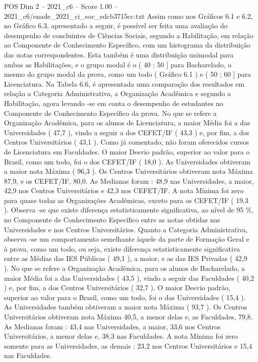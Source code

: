 \begin{textsample}{POS Dim 2 – 2021\_c6 – Score 1.00 – 2021\_c6/enade\_2021\_ci\_soc\_edcb3715cc.txt}
Assim como nos Gráficos 6.1 e 6.2, no Gráfico 6.3, apresentado a seguir, é possível ser feita uma avaliação do desempenho de concluintes de Ciências Sociais, segundo a Habilitação, em relação ao Componente de Conhecimento Específico, com um histograma da distribuição das notas correspondentes.
Esta também é uma distribuição unimodal para ambas as Habilitações, e o grupo modal é o ( 40 ; 50 ] para Bacharelado, o mesmo do grupo modal da prova, como um todo ( Gráfico 6.1 ) e ( 50 ; 60 ] para Licenciatura.
Na Tabela 6.6, é apresentada uma comparação dos resultados em relação a Categoria Administrativa, a Organização Acadêmica e segundo a Habilitação, agora levando -se em conta o desempenho de estudantes no Componente de Conhecimento Específico da prova.
No que se refere a Organização Acadêmica, para os alunos de Licenciatura, a maior Média foi a das Universidades ( 47,7 ), vindo a seguir a dos CEFET/IF ( 43,3 ) e, por fim, a dos Centros Universitários ( 43,1 ).
Como já comentado, não foram oferecidos cursos de Licenciatura em Faculdades.
O maior Desvio padrão, superior ao valor para o Brasil, como um todo, foi o dos CEFET/IF ( 18,0 ).
As Universidades obtiveram a maior nota Máxima ( 96,3 ).
Os Centros Universitários obtiveram nota Máxima 87,9, e os CEFET/IF, 80,0.
As Medianas foram : 48,9 nas Universidades, a maior, 42,9 nos Centros Universitários e 42,3 nos CEFET/IF.
A nota Mínima foi zero para quase todas as Organizações Acadêmicas, exceto para os CEFET/IF ( 19,3 ).
Observa -se que existe diferença estatisticamente significativa, ao nível de 95 \%, no Componente de Conhecimento Específico entre as notas obtidas nas Universidades e nos Centros Universitários.
Quanto a Categoria Administrativa, observa -se um comportamento semelhante àquele da parte de Formação Geral e à prova, como um todo, ou seja, existe diferença estatisticamente significativa entre as Médias das IES Públicas ( 49,1 ), a maior, e as das IES Privadas ( 42,9 ).
No que se refere a Organização Acadêmica, para os alunos de Bacharelado, a maior Média foi a das Universidades ( 43,5 ), vindo a seguir das Faculdades ( 40,2 ) e, por fim, a dos Centros Universitários ( 32,7 ).
O maior Desvio padrão, superior ao valor para o Brasil, como um todo, foi o das Universidades ( 15,4 ).
As Universidades também obtiveram a maior nota Máxima ( 93,7 ).
Os Centros Universitários obtiveram nota Máxima 40,5, a menor delas e, as Faculdades, 79,8.
As Medianas foram : 43,4 nas Universidades, a maior, 33,6 nos Centros Universitários, a menor delas e, 38,3 nas Faculdades.
A nota Mínima foi zero somente para as Universidades, as demais : 23,2 nos Centros Universitários e 15,4 nas Faculdades.

\end{textsample}

